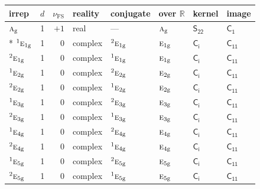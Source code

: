 \documentclass[10pt,a4paper]{article}
\numberwithin{equation}{section}
\newcommand{\grp}[1]{\mathsf{#1}}
\newcommand{\irr}[1]{\text{\normalfont\scshape #1}}
\newcommand{\conjpair}[1]{{}^{#1}}
\newcommand{\ptag}[1]{\mathrm{#1}}
\newcommand{\fsind}{\nu_{\mathrm{FS}}}
\begin{document}
{\small\renewcommand{\arraystretch}{1.25}\setlength{\tabcolsep}{4pt}\begin{longtable}{@{}lrrlllll@{}}\toprule
irrep & $d$ & $\fsind$ & reality & conjugate & over $\mathbb{R}$ & kernel & image\\\midrule\endhead
\bottomrule\endfoot\endlastfoot
$\irr{a}_{\ptag{g}}$ & 1 & $+1$ & real & --- & $\irr{a}_{\ptag{g}}$ & \href{S22.pdf}{$\grp{S_{22}}$} & \href{C1.pdf}{$\grp{C_{1}}$}\\*
$\conjpair{1}\irr{e}_{1\ptag{g}}$ & 1 & $0$ & complex & $\conjpair{2}\irr{e}_{1\ptag{g}}$ & $\irr{e}_{1\ptag{g}}$ & \href{S2.pdf}{$\grp{C_{i}}$} & \href{C11.pdf}{$\grp{C_{11}}$}\\
$\conjpair{2}\irr{e}_{1\ptag{g}}$ & 1 & $0$ & complex & $\conjpair{1}\irr{e}_{1\ptag{g}}$ & $\irr{e}_{1\ptag{g}}$ & \href{S2.pdf}{$\grp{C_{i}}$} & \href{C11.pdf}{$\grp{C_{11}}$}\\
$\conjpair{1}\irr{e}_{2\ptag{g}}$ & 1 & $0$ & complex & $\conjpair{2}\irr{e}_{2\ptag{g}}$ & $\irr{e}_{2\ptag{g}}$ & \href{S2.pdf}{$\grp{C_{i}}$} & \href{C11.pdf}{$\grp{C_{11}}$}\\
$\conjpair{2}\irr{e}_{2\ptag{g}}$ & 1 & $0$ & complex & $\conjpair{1}\irr{e}_{2\ptag{g}}$ & $\irr{e}_{2\ptag{g}}$ & \href{S2.pdf}{$\grp{C_{i}}$} & \href{C11.pdf}{$\grp{C_{11}}$}\\
$\conjpair{1}\irr{e}_{3\ptag{g}}$ & 1 & $0$ & complex & $\conjpair{2}\irr{e}_{3\ptag{g}}$ & $\irr{e}_{3\ptag{g}}$ & \href{S2.pdf}{$\grp{C_{i}}$} & \href{C11.pdf}{$\grp{C_{11}}$}\\
$\conjpair{2}\irr{e}_{3\ptag{g}}$ & 1 & $0$ & complex & $\conjpair{1}\irr{e}_{3\ptag{g}}$ & $\irr{e}_{3\ptag{g}}$ & \href{S2.pdf}{$\grp{C_{i}}$} & \href{C11.pdf}{$\grp{C_{11}}$}\\
$\conjpair{1}\irr{e}_{4\ptag{g}}$ & 1 & $0$ & complex & $\conjpair{2}\irr{e}_{4\ptag{g}}$ & $\irr{e}_{4\ptag{g}}$ & \href{S2.pdf}{$\grp{C_{i}}$} & \href{C11.pdf}{$\grp{C_{11}}$}\\
$\conjpair{2}\irr{e}_{4\ptag{g}}$ & 1 & $0$ & complex & $\conjpair{1}\irr{e}_{4\ptag{g}}$ & $\irr{e}_{4\ptag{g}}$ & \href{S2.pdf}{$\grp{C_{i}}$} & \href{C11.pdf}{$\grp{C_{11}}$}\\
$\conjpair{1}\irr{e}_{5\ptag{g}}$ & 1 & $0$ & complex & $\conjpair{2}\irr{e}_{5\ptag{g}}$ & $\irr{e}_{5\ptag{g}}$ & \href{S2.pdf}{$\grp{C_{i}}$} & \href{C11.pdf}{$\grp{C_{11}}$}\\
$\conjpair{2}\irr{e}_{5\ptag{g}}$ & 1 & $0$ & complex & $\conjpair{1}\irr{e}_{5\ptag{g}}$ & $\irr{e}_{5\ptag{g}}$ & \href{S2.pdf}{$\grp{C_{i}}$} & \href{C11.pdf}{$\grp{C_{11}}$}\\

\end{longtable}}
\end{document}
